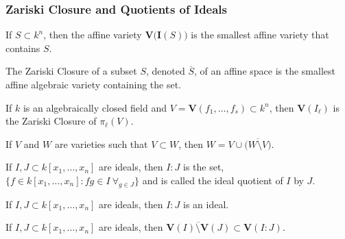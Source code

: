 \documentclass[crop=false,class=book,oneside]{standalone}
\begin{document}
            \subsubsection{Zariski Closure and Quotients of Ideals}
                \begin{theorem}
                        If $S\subset k^n$, then the affine variety
                        $\mathbf{V}\big(\textbf{I}(S)\big)$ is
                        the smallest affine variety that contains $S$.
                \end{theorem}
                \begin{definition}
                    The Zariski Closure of a subset $S$,
                    denoted $\overline{S}$, of an affine space
                    is the smallest affine algebraic variety
                    containing the set. 
                \end{definition}
                \begin{theorem}
                    If $k$ is an algebraically closed field
                    and $V=\mathbf{V}(f_1,\hdots, f_s)\subset k^n$,
                    then $\mathbf{V}(I_{\ell})$ is the Zariski Closure
                    of $\pi_{\ell}(V)$.
                \end{theorem}
                \begin{theorem}
                    If $V$ and $W$ are varieties such that
                    $V\subset W$,
                    then $W=V\cup \overline{\big(W\setminus V\big)}$.
                \end{theorem}
                \begin{definition}
                    If $I,J\subset k[x_1,\hdots ,x_n]$ are ideals,
                    then $I:J$ is the set,
                    $\{f\in k[x_1,\hdots ,x_n]: fg \in I\ \forall_{g\in J}\}$
                    and is called the ideal quotient of $I$ by $J$.
                \end{definition}
                \begin{theorem}
                    If $I,J\subset k[x_1,\hdots ,x_n]$ are ideals,
                    then $I:J$ is an ideal.
                \end{theorem}
                \begin{theorem}
                    If $I,J\subset k[x_1,\hdots ,x_n]$ are ideals,
                    then
                    $\overline{\mathbf{V}(I)\setminus%
                     \mathbf{V}(J)}\subset\mathbf{V}(I:J)$.
                \end{theorem}
\end{document}
